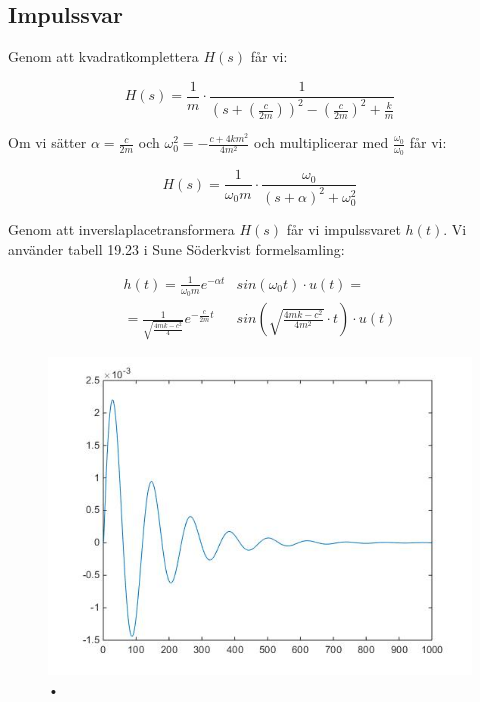 \documentclass[10pt,a4paper]{article}
\begin{document}
\newpage


\subsection{Impulssvar}

Genom att kvadratkomplettera $H(s)$ får vi:

\begin{equation}
H(s) = \frac{1}{m} \cdot \frac{1}{(s+(\frac{c}{2  m}))^2-(\frac{c}{2  m})^2+\frac{k}{m}} 
\end{equation}

Om vi sätter $\alpha = \frac{c}{2m}$ och $\omega_0^2 = {-\frac{c + 4 k  m^2}{4  m^2}}$ och multiplicerar med $\frac{\omega_0}{\omega_0}$ får vi:

\begin{equation}
H(s) = \frac{1}{\omega_0  m} \cdot \frac{\omega_0}{(s + \alpha)^2 +\omega_0^2}
\end{equation}

Genom att inverslaplacetransformera $H(s)$ får vi impulssvaret $h(t)$. Vi använder tabell 19.23 i Sune Söderkvist formelsamling:

\begin{equation}
\begin{split}
h(t) = \frac{1}{\omega_0  m}  e^{-\alpha  t} &  sin(\omega_0  t) \cdot u(t) = \\ = \frac{1}{\sqrt{\frac{4  m  k - c^2}{4}} }   e^{-\frac{c}{2m} t}  & sin(\sqrt{\frac{4  m  k - c^2}{4  m^2}} \cdot t) \cdot u(t)
\end{split}
\end{equation}



\begin{figure}[h]
\begin{center}

\includegraphics[scale=0.5]{Impulssvar}
\caption{•}
\end{center}
\end{figure}
\end{document}

